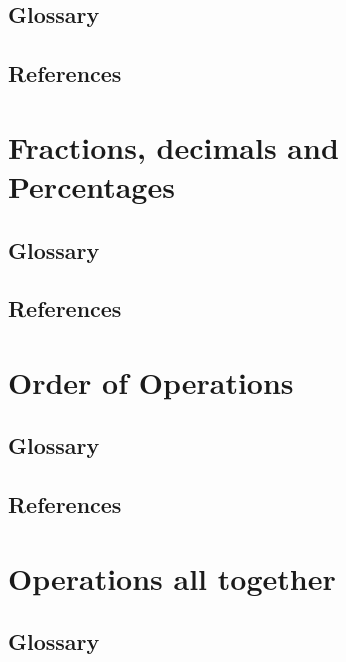 \documentclass[12pt]{book}
\begin{document}




\section{Glossary}
\section{References}
\newpage

\chapter{Fractions, decimals and Percentages}%
\section{Glossary}
\section{References}
\newpage


\chapter{Order of Operations}%
\section{Glossary}
\section{References}
\newpage

\chapter{Operations all together}%
\section{Glossary}
\end{document}
